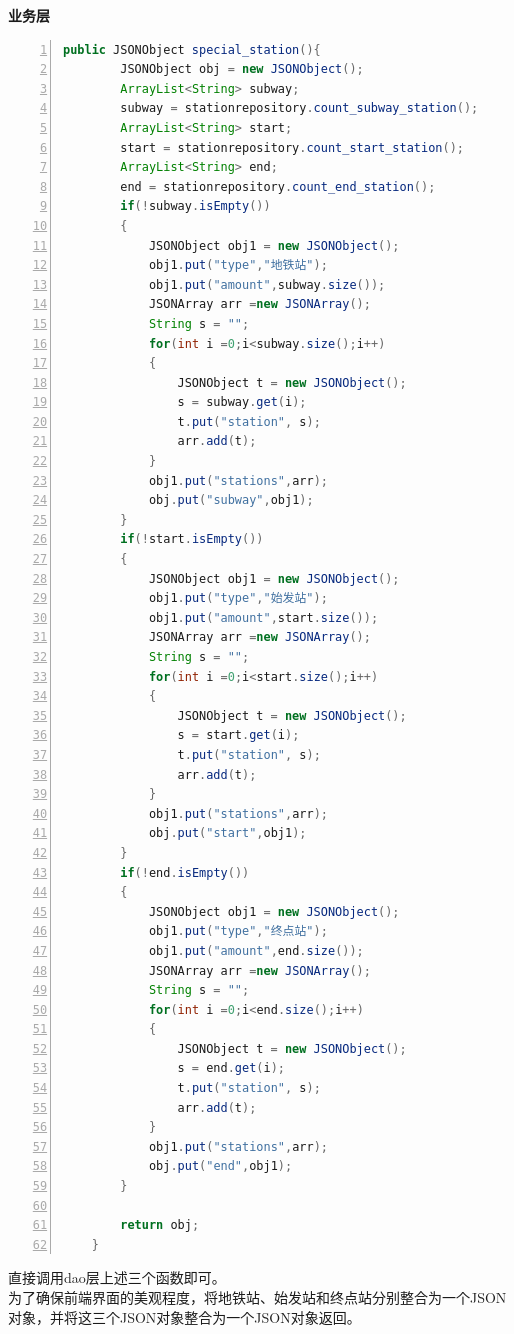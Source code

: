 \documentclass[11pt,a4paper]{article}
\begin{document}
\textbf{业务层} \\
\begin{lstlisting}[numbers = left, 
showstringspaces=false,
showspaces = false,
breaklines = true, 
language=Java]
    public JSONObject special_station(){
        JSONObject obj = new JSONObject();
        ArrayList<String> subway;
        subway = stationrepository.count_subway_station();
        ArrayList<String> start;
        start = stationrepository.count_start_station();
        ArrayList<String> end;
        end = stationrepository.count_end_station();
        if(!subway.isEmpty())
        {
            JSONObject obj1 = new JSONObject();
            obj1.put("type","地铁站");
            obj1.put("amount",subway.size());
            JSONArray arr =new JSONArray();
            String s = "";
            for(int i =0;i<subway.size();i++)
            {
                JSONObject t = new JSONObject();
                s = subway.get(i);
                t.put("station", s);
                arr.add(t);
            }
            obj1.put("stations",arr);
            obj.put("subway",obj1);
        }
        if(!start.isEmpty())
        {
            JSONObject obj1 = new JSONObject();
            obj1.put("type","始发站");
            obj1.put("amount",start.size());
            JSONArray arr =new JSONArray();
            String s = "";
            for(int i =0;i<start.size();i++)
            {
                JSONObject t = new JSONObject();
                s = start.get(i);
                t.put("station", s);
                arr.add(t);
            }
            obj1.put("stations",arr);
            obj.put("start",obj1);
        }
        if(!end.isEmpty())
        {
            JSONObject obj1 = new JSONObject();
            obj1.put("type","终点站");
            obj1.put("amount",end.size());
            JSONArray arr =new JSONArray();
            String s = "";
            for(int i =0;i<end.size();i++)
            {
                JSONObject t = new JSONObject();
                s = end.get(i);
                t.put("station", s);
                arr.add(t);
            }
            obj1.put("stations",arr);
            obj.put("end",obj1);
        }

        return obj;
    }
\end{lstlisting} 
直接调用dao层上述三个函数即可。\\
为了确保前端界面的美观程度，将地铁站、始发站和终点站分别整合为一个JSON对象，并将这三个JSON对象整合为一个JSON对象返回。
\end{document}
